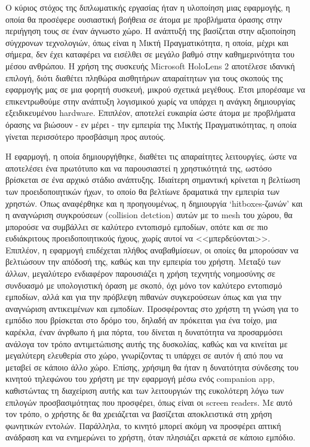Ο κύριος στόχος της διπλωματικής εργασίας ήταν η υλοποίηση μιας εφαρμογής, η οποία θα προσέφερε ουσιαστική βοήθεια σε άτομα με προβλήματα όρασης στην περιήγηση τους σε έναν άγνωστο χώρο. Η ανάπτυξή της βασίζεται στην αξιοποίηση σύγχρονων τεχνολογιών, όπως είναι η Μικτή Πραγματικότητα, η οποία, μέχρι και σήμερα, δεν έχει καταφέρει να εισέλθει σε μεγάλο βαθμό στην καθημερινότητα του μέσου ανθρώπου. Η χρήση της συσκευής Microsoft HoloLens 2 αποτέλεσε ιδανική επιλογή, διότι διαθέτει πληθώρα αισθητήρων απαραίτητων για τους σκοπούς της εφαρμογής μας σε μια φορητή συσκευή, μικρού σχετικά μεγέθους. Έτσι μπορέσαμε να επικεντρωθούμε στην ανάπτυξη λογισμικού χωρίς να υπάρχει η ανάγκη δημιουργίας εξειδικευμένου hardware. Επιπλέον, αποτελεί ευκαιρία ώστε άτομα με προβλήματα όρασης να βιώσουν - εν μέρει - την εμπειρία της Μικτής Πραγματικότητας, η οποία γίνεται περισσότερο προσβάσιμη προς αυτούς. %

Η εφαρμογή, η οποία δημιουργήθηκε, διαθέτει τις απαραίτητες λειτουργίες, ώστε να αποτελέσει ένα πρωτότυπο και να παρουσιαστεί η χρηστικότητά της, ωστόσο βρίσκεται σε ένα αρχικό στάδιο ανάπτυξης. Ιδιαίτερη σημαντική κρίνεται η βελτίωση των προειδοποιητικών ήχων, το οποίο θα βελτίωνε δραματικά την εμπειρία των χρηστών. Όπως αναφέρθηκε και η προηγουμένως, η δημιουργία `hitboxes-ζωνών' και η αναγνώριση συγκρούσεων (collision detction) αυτών με το mesh του χώρου, θα μπορούσε να συμβάλλει σε καλύτερο εντοπισμό εμποδίων, οπότε και σε πιο ευδιάκριτους προειδοποιητικούς ήχους, χωρίς αυτοί να <<μπερδεύονται>>. Επιπλέον, η εφαρμογή επιδέχεται πλήθος αναβαθμίσεων, οι οποίες θα μπορούσαν να βελτιώσουν την απόδοσή της, καθώς και την εμπειρία του χρήστη. Μεταξύ των άλλων, μεγαλύτερο ενδιαφέρον παρουσιάζει η χρήση τεχνητής νοημοσύνης σε συνδυασμό με υπολογιστική όραση με σκοπό, όχι μόνο τον καλύτερο εντοπισμό εμποδίων, αλλά και για την πρόβλεψη πιθανών συγκερούσεων όπως και για την αναγνώριση αντικειμένων και εμποδίων. Προσφέροντας στο χρήστη τη γνώση για το εμπόδιο που βρίσκεται στο δρόμο του, δηλαδή αν πρόκειται για ένα τοίχο, μια καρέκλα, έναν άνρθωπο ή μια πόρτα, του δίνεται η δυνατότητα να προσαρμόσει ανάλογα τον τρόπο αντιμετώπισης αυτής της δυσκολίας, καθώς και να κινείται με μεγαλύτερη ελευθερία στο χώρο, γνωρίζοντας τι υπάρχει σε αυτόν ή από που να μεταβεί σε κάποιο άλλο χώρο. Επίσης, χρήσιμη θα ήταν η δυνατότητα σύνδεσης του κινητού τηλεφώνου του χρήστη με την εφαρμογή μέσω ενός companion app, καθιστώντας τη διαχείριση αυτής και των λειτουργιών της ευκολότερη λόγω των επιλογών προσβασιμότητας που προσφέρει, όπως είναι οι screen readers. Με αυτό τον τρόπο, ο χρήστης δε θα χρειάζεται να βασίζεται αποκλειστικά στη χρήση φωνητικών εντολών. Παράλληλα, το κινητό μπορεί ακόμη να προσφέρει απτική ανάδραση και να ενημερώνει το χρήστη, όταν πλησιάζει αρκετά σε κάποιο εμπόδιο.